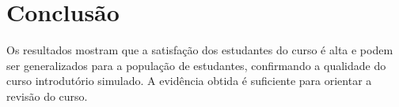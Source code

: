 \section{Conclusão}
Os resultados mostram que a satisfação dos estudantes do curso é alta e podem ser generalizados para a população de estudantes, confirmando a qualidade do curso introdutório simulado.
A evidência obtida é suficiente para orientar a revisão do curso.
